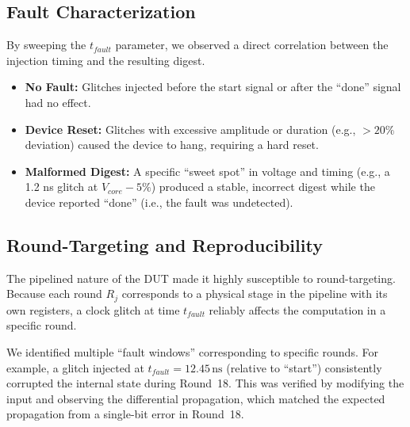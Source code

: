 \documentclass[11pt, a4paper]{article}
\begin{document}
\subsection{Fault Characterization}
By sweeping the $t_{fault}$ parameter, we observed a direct correlation between the injection timing and the resulting digest.
\begin{itemize}
    \item \textbf{No Fault:} Glitches injected before the start signal or after the ``done'' signal had no effect.
    \item \textbf{Device Reset:} Glitches with excessive amplitude or duration (e.g., $>20\%$ deviation) caused the device to hang, requiring a hard reset.
    \item \textbf{Malformed Digest:} A specific ``sweet spot'' in voltage and timing (e.g., a 1.2 ns glitch at $V_{core} - 5\%$) produced a stable, incorrect digest while the device reported ``done'' (i.e., the fault was undetected).
\end{itemize}

\subsection{Round-Targeting and Reproducibility}
The pipelined nature of the DUT made it highly susceptible to round-targeting. Because each round $R_j$ corresponds to a physical stage in the pipeline with its own registers, a clock glitch at time $t_{fault}$ reliably affects the computation in a specific round.

We identified multiple ``fault windows'' corresponding to specific rounds. For example, a glitch injected at $t_{fault} = 12.45\,\text{ns}$ (relative to ``start'') consistently corrupted the internal state during Round~18. This was verified by modifying the input and observing the differential propagation, which matched the expected propagation from a single-bit error in Round~18.
\end{document}
